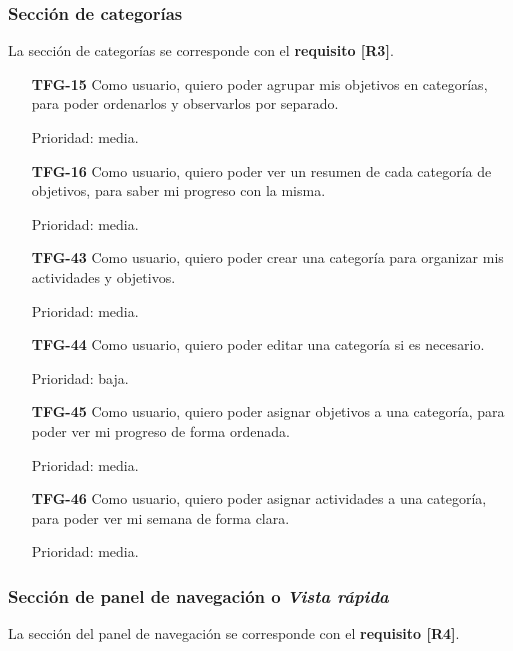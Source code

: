 \documentclass[10pt, a4paper]{aqademic}
\begin{document}
\subsubsection*{Sección de categorías}

La sección de categorías se corresponde con el \textbf{requisito [R3]}.

\begin{itemize}[leftmargin=16mm]
	\item [\textbf{TFG-15}] Como usuario, quiero poder agrupar mis objetivos en categorías, para poder ordenarlos y observarlos por separado.
	
	Prioridad: media.
	
	\item [\textbf{TFG-16}] Como usuario, quiero poder ver un resumen de cada categoría de objetivos, para saber mi progreso con la misma.
	
	Prioridad: media.
	
	\item [\textbf{TFG-43}] Como usuario, quiero poder crear una categoría para organizar mis actividades y objetivos.
	
	Prioridad: media.
	
	
	\item [\textbf{TFG-44}] Como usuario, quiero poder editar una categoría si es necesario.
	
	Prioridad: baja.
	
	\item [\textbf{TFG-45}] Como usuario, quiero poder asignar objetivos a una categoría, para poder ver mi progreso de forma ordenada.
	
	Prioridad: media.
	
	\item [\textbf{TFG-46}] Como usuario, quiero poder asignar actividades a una categoría, para poder ver mi semana de forma clara.
	
	Prioridad: media.
\end{itemize}

\subsubsection*{Sección de panel de navegación o \textit{Vista rápida}}

La sección del panel de navegación se corresponde con el \textbf{requisito [R4]}.
\end{document}
